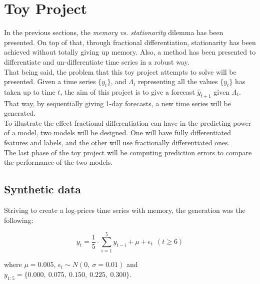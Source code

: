 \documentclass[a4paper]{report}
\begin{document}
\section{Toy Project}
\label{sec:toyProjectFracDiff}
In the previous sections, the \textit{memory vs. stationarity} dilemma has 
been presented. On top of that, through fractional differentiation, 
stationarity has been achieved without totally giving up memory. Also, a 
method has been presented to differentiate and un-differentiate time series 
in a robust way.\\

That being said, the problem that this toy project attempts to solve will be 
presented. Given a time series $\{ y_t \}$, and $\Lambda_t$ representing all 
the values $\{ y_t \}$ has taken up to time $t$, the aim of this project is 
to give a forecast $\widehat{y}_{t + 1}$ given $\Lambda_t$. That way, by 
sequentially giving 1-day forecasts, a new time series will be generated.\\

To illustrate the effect fractional differentiation can have in the 
predicting power of a model, two models will be designed. One will have 
fully differentiated features and labels, and the other will use 
fractionally differentiated ones.\\

The last phase of the toy project will be computing prediction errors to 
compare the performance of the two models. 

\subsection{Synthetic data}
\label{sec:fracDiffToySyntheticData}
Striving to create a log-prices time series with memory, the generation was 
the following:

\begin{equation}
\label{eqn:tSeriesSynthetic}
	y_{t} = \frac{1}{5} \cdot \sum_{i = 1}^{5} y_{t - i} + 
	\mu + \epsilon_t \ \ (t \geq 6)
\end{equation}

where $\mu = 0.005$, $\epsilon_t \sim N(0,\ \sigma = 0.01)$ and 
$y_{1:5} = \{0.000,\ 0.075,\ 0.150,\ 0.225,\ 0.300\}$.\\
\end{document}

